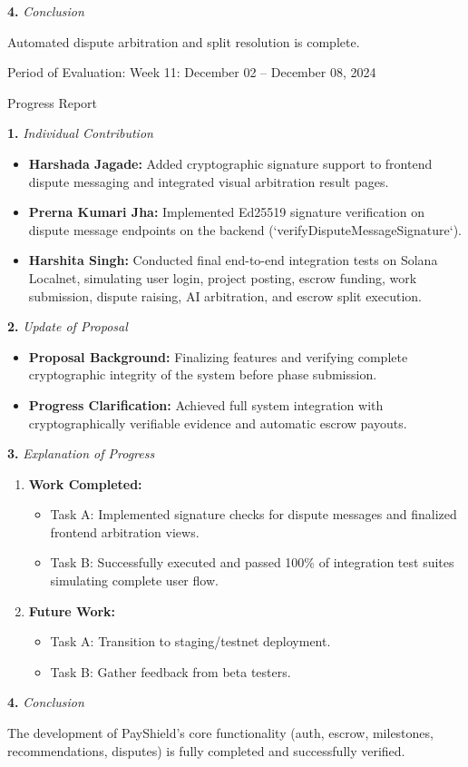 \documentclass[12pt]{article}
\newcommand{\phasetitle}[1]{{\large Period of Evaluation: #1}\par\vspace{4pt}}
\newcommand{\progressreport}{{\large Progress Report}\par\vspace{4pt}}
\newcommand{\subhead}[2]{\textbf{#1.} \textit{#2}\par}
\begin{document}
\subhead{4}{Conclusion}
Automated dispute arbitration and split resolution is complete.

\newpage

\phasetitle{Week 11: December 02 -- December 08, 2024}

\progressreport

\subhead{1}{Individual Contribution}
\begin{itemize}[leftmargin=2em]
    \item \textbf{Harshada Jagade:} Added cryptographic signature support to frontend dispute messaging and integrated visual arbitration result pages.
    \item \textbf{Prerna Kumari Jha:} Implemented Ed25519 signature verification on dispute message endpoints on the backend (`verifyDisputeMessageSignature`).
    \item \textbf{Harshita Singh:} Conducted final end-to-end integration tests on Solana Localnet, simulating user login, project posting, escrow funding, work submission, dispute raising, AI arbitration, and escrow split execution.
\end{itemize}

\subhead{2}{Update of Proposal}
\begin{itemize}[leftmargin=2em]
    \item \textbf{Proposal Background:} Finalizing features and verifying complete cryptographic integrity of the system before phase submission.
    \item \textbf{Progress Clarification:} Achieved full system integration with cryptographically verifiable evidence and automatic escrow payouts.
\end{itemize}

\newpage

\subhead{3}{Explanation of Progress}
\begin{enumerate}[leftmargin=2em]
    \item \textbf{Work Completed:}
    \begin{itemize}[leftmargin=2em]
        \item Task A: Implemented signature checks for dispute messages and finalized frontend arbitration views.
        \item Task B: Successfully executed and passed 100\% of integration test suites simulating complete user flow.
    \end{itemize}
    \item \textbf{Future Work:}
    \begin{itemize}[leftmargin=2em]
        \item Task A: Transition to staging/testnet deployment.
        \item Task B: Gather feedback from beta testers.
    \end{itemize}
\end{enumerate}

\subhead{4}{Conclusion}
The development of PayShield's core functionality (auth, escrow, milestones, recommendations, disputes) is fully completed and successfully verified.
\end{document}
